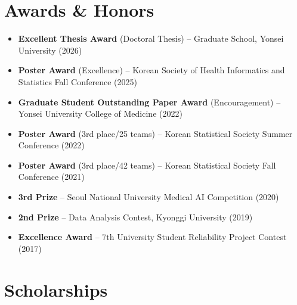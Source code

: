 \documentclass[10pt,a4paper]{article}
\begin{document}
\section*{Awards \& Honors}

\begin{itemize}[leftmargin=1em]
    \setlength\itemsep{0.2em}
    \item \textbf{Excellent Thesis Award} (Doctoral Thesis) -- Graduate School, Yonsei University (2026)
    \item \textbf{Poster Award} (Excellence) -- Korean Society of Health Informatics and Statistics Fall Conference (2025)
    \item \textbf{Graduate Student Outstanding Paper Award} (Encouragement) -- Yonsei University College of Medicine (2022)
    \item \textbf{Poster Award} (3rd place/25 teams) -- Korean Statistical Society Summer Conference (2022)
    \item \textbf{Poster Award} (3rd place/42 teams) -- Korean Statistical Society Fall Conference (2021)
    \item \textbf{3rd Prize} -- Seoul National University Medical AI Competition (2020)
    \item \textbf{2nd Prize} -- Data Analysis Contest, Kyonggi University (2019)
    \item \textbf{Excellence Award} -- 7th University Student Reliability Project Contest (2017)
\end{itemize}

\section*{Scholarships}
\end{document}
